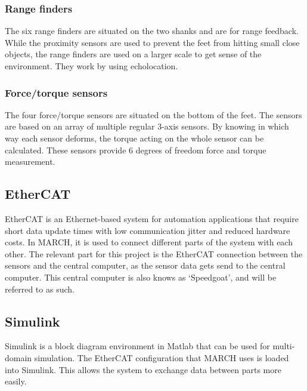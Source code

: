 \subsubsection{Range finders}
The six range finders are situated on the two shanks and are for range feedback. While the proximity sensors are used to prevent the feet from hitting small close objects, the range finders are used on a larger scale to get sense of the environment. They work by using echolocation.
\subsubsection{Force/torque sensors}
The four force/torque sensors are situated on the bottom of the feet. The sensors are based on an array of multiple regular 3-axis sensors. By knowing in which way each sensor deforms, the torque acting on the whole sensor can be calculated. These sensors provide 6 degrees of freedom force and torque measurement.
\subsection{EtherCAT}\label{sec:etherCat}
EtherCAT is an Ethernet-based system for automation applications that require short data update times with low communication jitter and reduced hardware costs. In MARCH, it is used to connect different parts of the system with each other. The relevant part for this project is the EtherCAT connection between the sensors and the central computer, as the sensor data gets send to the central computer. This central computer is also knows as `Speedgoat', and will be referred to as such.
\subsection{Simulink} 
Simulink is a block diagram environment in Matlab that can be used for multi-domain simulation. The EtherCAT configuration that MARCH uses is loaded into Simulink. This allows the system to exchange data between parts more easily. 

